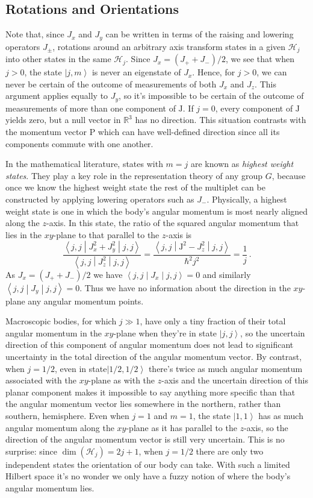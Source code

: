 \documentclass{article}
\theoremstyle{plain}\theoremheaderfont{\normalfont\itshape}\theorembodyfont{\rmfamily}\theoremseparator{.}\newtheorem*{rem}{Remark}\newtheorem*{ex}{Example}\newtheorem*{proof}{Proof}\newtheorem*{altp}{Alternative proof}
\theoremstyle{plain}\theoremheaderfont{\normalfont\bfseries}\theorembodyfont{\rmfamily}\theoremseparator{.}\newtheorem{thm}{Theorem}[section]\newtheorem{lem}[thm]{Lemma}\newtheorem{prop}[thm]{Proposition}\newtheorem*{cor}{Corollary}\newtheorem{defn}[thm]{Definition}\newtheorem{clm}[thm]{Claim}\newtheorem{clminproof}{Claim}
\theoremstyle{break}\theoremheaderfont{\normalfont\itshape}\theorembodyfont{\rmfamily}\theoremseparator{.\medskip}\newtheorem*{proofskip}{Proof}\newtheorem*{exs}{Examples}\newtheorem*{rems}{Remarks}
\theoremstyle{break}\theoremheaderfont{\normalfont\bfseries}\theorembodyfont{\rmfamily}\theoremseparator{.\medskip}\newtheorem{lemskip}[thm]{Lemma}\newtheorem{defnskip}[thm]{Definition}\newtheorem{propskip}[thm]{Proposition}\newtheorem{thmskip}[thm]{Theorem}
\numberwithin{equation}{section}
\newcommand{\ket}[1]{\left| #1 \right\rangle}
\newcommand{\expval}[2]{\left\langle #2 \middle| #1 \middle| #2 \right\rangle}
\newcommand{\vb}[1]{\bm{\mathrm{#1}}}
\newcommand{\hb}{\mathcal{H}}
\newcommand{\RR}{\mathbb{R}}
\begin{document}
    \subsection{Rotations and Orientations}
    Note that, since \(J_x\) and \(J_y\) can be written in terms of the raising and lowering operators \(J_{\pm}\), rotations around an arbitrary axis transform states in a given \(\hb_j\) into other states in the same \(\hb_j\). Since \(J_x=(J_+ +J_-)/2\), we see that when \(j>0\), the state \(\ket{j,m}\) is never an eigenstate of \(J_x\). Hence, for \(j>0\), we can never be certain of the outcome of measurements of both \(J_x\) and \(J_z\). This argument applies equally to \(J_y\), so it's impossible to be certain of the outcome of measurements of more than one component of \(\vb{J}\). If \(j=0\), every component of \(\vb{J}\) yields zero, but a null vector in \(\RR^3\) has no direction. This situation contrasts with the momentum vector \(\vb{P}\) which can have well-defined direction since all its components commute with one another.

    In the mathematical literature, states with \(m=j\) are known as \textit{highest weight states}. They play a key role in the representation theory of any group \(G\), because once we know the highest weight state the rest of the multiplet can be constructed by applying lowering operators such as \(J_-\). Physically, a highest weight state is one in which the body's angular momentum is most nearly aligned along the \(z\)-axis. In this state, the ratio of the squared angular momentum that lies in the \(xy\)-plane to that parallel to the \(z\)-axis is
    \begin{equation}
        \frac{\expval{J_x^2+J_y^2}{j,j}}{\expval{J_z^2}{j,j}}=\frac{\expval{\vb{J}^2-J_z^2}{j,j}}{\hbar^2j^2}=\frac{1}{j}\,.
    \end{equation}
    As \(J_x=(J_+ + J_-)/2\) we have \(\expval{J_x}{j,j}=0\) and similarly \(\expval{J_y}{j,j}=0\). Thus we have no information about the direction in the \(xy\)-plane any angular momentum points.

    Macroscopic bodies, for which \(j\gg 1\), have only a tiny fraction of their total angular momentum in the \(xy\)-plane when they're in state \(\ket{j,j}\), so the uncertain direction of this component of angular momentum does not lead to significant uncertainty in the total direction of the angular momentum vector. By contrast, when \(j=1/2\), even in state\(\ket{1/2,1/2}\) there's twice as much angular momentum associated with the \(xy\)-plane as with the \(z\)-axis and the uncertain direction of this planar component makes it impossible to say anything more specific than that the angular momentum vector lies somewhere in the northern, rather than southern, hemisphere. Even when \(j=1\) and \(m=1\), the state \(\ket{1,1}\) has as much angular momentum along the \(xy\)-plane as it has parallel to the \(z\)-axis, so the direction of the angular momentum vector is still very uncertain. This is no surprise: since \(\dim(\hb_j)=2j+1\), when \(j=1/2\) there are only two independent states the orientation of our body can take. With such a limited Hilbert space it's no wonder we only have a fuzzy notion of where the body's angular momentum lies.
\end{document}

